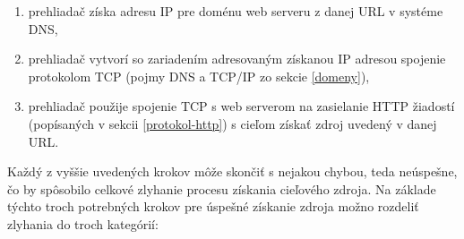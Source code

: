 \begin{enumerate}
    \item prehliadač získa adresu IP pre doménu web serveru z danej URL v systéme DNS,
    
    \item prehliadač vytvorí so zariadením adresovaným získanou IP adresou spojenie protokolom TCP 
    (pojmy DNS a TCP/IP zo sekcie \ref{domeny}),
    
    \item prehliadač použije spojenie TCP s web serverom na zasielanie HTTP žiadostí 
    (popísaných v sekcii \ref{protokol-http}) s cieľom získať zdroj uvedený v danej URL.
\end{enumerate}

Každý z vyššie uvedených krokov môže skončiť s nejakou chybou, teda neúspešne, čo by spôsobilo celkové zlyhanie procesu získania cieľového zdroja.
Na základe týchto troch potrebných krokov pre úspešné získanie zdroja možno rozdeliť zlyhania do troch kategórií:

